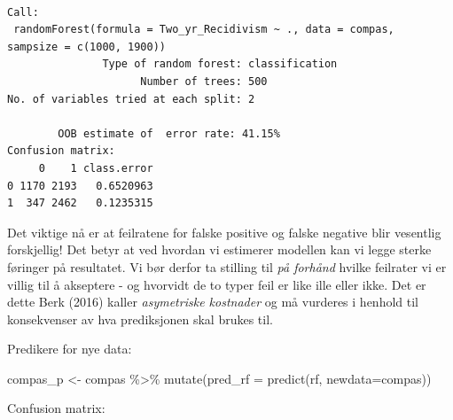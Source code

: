 \documentclass[
  letterpaper,
  DIV=11,
  numbers=noendperiod]{scrreprt}
\newenvironment{Shaded}{\begin{snugshade}}{\end{snugshade}}
\newcommand{\AttributeTok}[1]{\textcolor[rgb]{0.40,0.45,0.13}{#1}}
\newcommand{\FunctionTok}[1]{\textcolor[rgb]{0.28,0.35,0.67}{#1}}
\newcommand{\NormalTok}[1]{\textcolor[rgb]{0.00,0.23,0.31}{#1}}
\newcommand{\OtherTok}[1]{\textcolor[rgb]{0.00,0.23,0.31}{#1}}
\newcommand{\SpecialCharTok}[1]{\textcolor[rgb]{0.37,0.37,0.37}{#1}}
\newcommand{\StringTok}[1]{\textcolor[rgb]{0.13,0.47,0.30}{#1}}
\theoremstyle{definition}
\theoremstyle{remark}
\begin{document}
\begin{verbatim}

Call:
 randomForest(formula = Two_yr_Recidivism ~ ., data = compas,      sampsize = c(1000, 1900)) 
               Type of random forest: classification
                     Number of trees: 500
No. of variables tried at each split: 2

        OOB estimate of  error rate: 41.15%
Confusion matrix:
     0    1 class.error
0 1170 2193   0.6520963
1  347 2462   0.1235315
\end{verbatim}

Det viktige nå er at feilratene for falske positive og falske negative
blir vesentlig forskjellig! Det betyr at ved hvordan vi estimerer
modellen kan vi legge sterke føringer på resultatet. Vi bør derfor ta
stilling til \emph{på forhånd} hvilke feilrater vi er villig til å
akseptere - og hvorvidt de to typer feil er like ille eller ikke. Det er
dette Berk (2016) kaller \emph{asymetriske kostnader} og må vurderes i
henhold til konsekvenser av hva prediksjonen skal brukes til.

Predikere for nye data:

\begin{Shaded}
\begin{Highlighting}[]
\NormalTok{compas\_p }\OtherTok{\textless{}{-}}\NormalTok{ compas }\SpecialCharTok{\%\textgreater{}\%} 
  \FunctionTok{mutate}\NormalTok{(}\AttributeTok{pred\_rf =} \FunctionTok{predict}\NormalTok{(rf, }\AttributeTok{newdata=}\NormalTok{compas))}
\end{Highlighting}
\end{Shaded}

Confusion matrix:

\begin{Shaded}
\end{Shaded}
\end{document}
